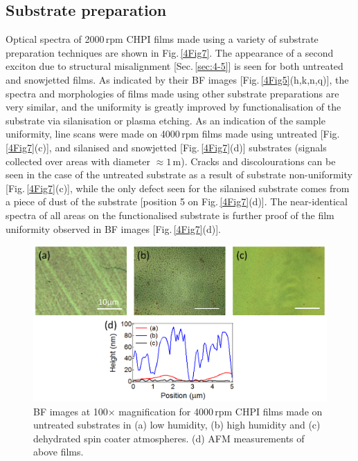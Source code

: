 \subsection{Substrate preparation}
Optical spectra of 2000\,rpm CHPI films made using a variety of substrate preparation techniques are shown in Fig.\,\ref{4Fig7}. The appearance of a second exciton due to structural misalignment [Sec.\,\ref{sec:4-5}] is seen for both untreated and snowjetted films. As indicated by their BF images [Fig.\,\ref{4Fig5}(h,k,n,q)], the spectra and morphologies of films made using other substrate preparations are very similar, and the uniformity is greatly improved by functionalisation of the substrate via silanisation or plasma etching. As an indication of the sample uniformity, line scans were made on 4000\,rpm films made using untreated [Fig.\,\ref{4Fig7}(c)], and silanised and snowjetted [Fig.\,\ref{4Fig7}(d)] substrates (signals collected over areas with diameter $\approx1\,$\textmu m). Cracks and discolourations can be seen in the case of the untreated substrate as a result of substrate non-uniformity [Fig.\,\ref{4Fig7}(c)], while the only defect seen for the silanised substrate comes from a piece of dust of the substrate [position 5 on Fig.\,\ref{4Fig7}(d)]. The near-identical spectra of all areas on the functionalised substrate is further proof of the film uniformity observed in BF images [Fig.\,\ref{4Fig7}(d)].

\begin{figure}[h!] 
\centering    
\includegraphics[width=\textwidth]{Fig8}
\caption{BF images at 100$\times$ magnification for 4000\,rpm CHPI films made on untreated substrates in (a) low humidity, (b) high humidity and (c) dehydrated spin coater atmospheres. (d) AFM measurements of above films.}
\label{4Fig8}
\end{figure}
